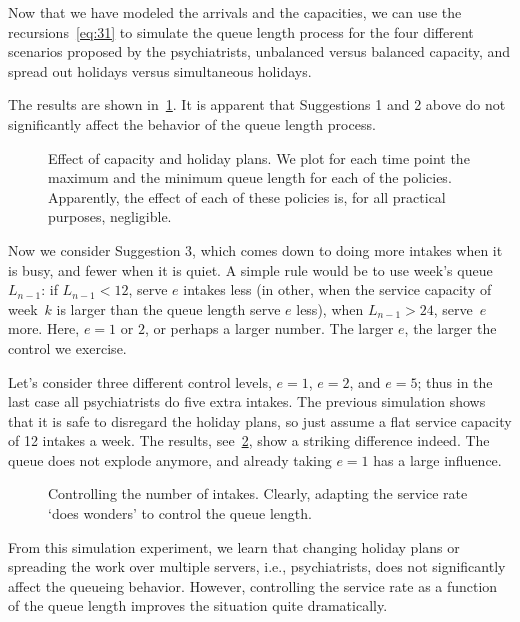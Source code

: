 Now that we have modeled the arrivals and the capacities, we can use the recursions~\cref{eq:31} to simulate the queue length process for the four different scenarios proposed by the psychiatrists, unbalanced versus balanced capacity, and spread out holidays versus simultaneous holidays.

The results are shown in~\cref{fig:balanced}.
It is apparent that Suggestions 1 and 2 above do not significantly affect the behavior of the queue length process.



\begin{figure}[ht]
 \centering
 
\caption{ Effect of capacity and holiday plans.
 We plot for each time point the maximum and the minimum queue length for each of the policies.
 Apparently, the effect of each of these policies is, for all practical purposes, negligible.
}
\label{fig:balanced}
\end{figure}


Now we consider Suggestion 3, which comes down to doing more intakes when it is busy, and fewer when it is quiet.
A simple rule would be to use week's queue $L_{n-1}$: if $L_{n-1}<12$, serve $e$ intakes less (in other, when the service capacity of week~$k$ is larger than the queue length serve $e$ less), when $L_{n-1}>24$, serve~$e$ more.
Here, $e=1$ or $2$, or perhaps a larger number.
The larger $e$, the larger the control we exercise.

Let's consider three different control levels, $e=1$, $e=2$, and $e=5$; thus in the last case all psychiatrists do five extra intakes.
The previous simulation shows that it is safe to disregard the holiday plans, so just assume a flat service capacity of 12 intakes a week.
The results, see~\cref{fig:intakes}, show a striking difference indeed.
The queue does not explode anymore, and already taking $e=1$ has a large influence.


\begin{figure}[ht]
 \centering
 
\caption{Controlling the number of intakes. Clearly, adapting the
 service rate `does wonders' to control the queue length.}
\label{fig:intakes}
\end{figure}


From this simulation experiment, we learn that changing holiday plans or spreading the work over multiple servers, i.e., psychiatrists, does not significantly affect the queueing behavior.
However, controlling the service rate as a function of the queue length improves the situation quite dramatically.


